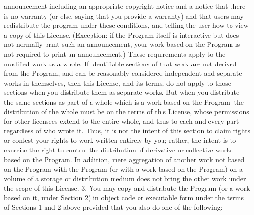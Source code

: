 \begin{DoxyCodeInclude}
\textcolor{stringliteral}{    announcement including an appropriate copyright notice and a}
\textcolor{stringliteral}{    notice that there is no warranty (or else, saying that you provide}
\textcolor{stringliteral}{    a warranty) and that users may redistribute the program under}
\textcolor{stringliteral}{    these conditions, and telling the user how to view a copy of this}
\textcolor{stringliteral}{    License.  (Exception: if the Program itself is interactive but}
\textcolor{stringliteral}{    does not normally print such an announcement, your work based on}
\textcolor{stringliteral}{    the Program is not required to print an announcement.)}
\textcolor{stringliteral}{}
\textcolor{stringliteral}{These requirements apply to the modified work as a whole.  If}
\textcolor{stringliteral}{identifiable sections of that work are not derived from the Program,}
\textcolor{stringliteral}{and can be reasonably considered independent and separate works in}
\textcolor{stringliteral}{themselves, then this License, and its terms, do not apply to those}
\textcolor{stringliteral}{sections when you distribute them as separate works.  But when you}
\textcolor{stringliteral}{distribute the same sections as part of a whole which is a work based}
\textcolor{stringliteral}{on the Program, the distribution of the whole must be on the terms of}
\textcolor{stringliteral}{this License, whose permissions for other licensees extend to the}
\textcolor{stringliteral}{entire whole, and thus to each and every part regardless of who wrote it.}
\textcolor{stringliteral}{}
\textcolor{stringliteral}{Thus, it is not the intent of this section to claim rights or contest}
\textcolor{stringliteral}{your rights to work written entirely by you; rather, the intent is to}
\textcolor{stringliteral}{exercise the right to control the distribution of derivative or}
\textcolor{stringliteral}{collective works based on the Program.}
\textcolor{stringliteral}{}
\textcolor{stringliteral}{In addition, mere aggregation of another work not based on the Program}
\textcolor{stringliteral}{with the Program (or with a work based on the Program) on a volume of}
\textcolor{stringliteral}{a storage or distribution medium does not bring the other work under}
\textcolor{stringliteral}{the scope of this License.}
\textcolor{stringliteral}{}
\textcolor{stringliteral}{  3. You may copy and distribute the Program (or a work based on it,}
\textcolor{stringliteral}{under Section 2) in object code or executable form under the terms of}
\textcolor{stringliteral}{Sections 1 and 2 above provided that you also do one of the following:}

\end{DoxyCodeInclude}
